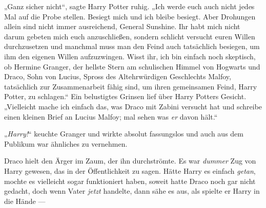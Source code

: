 „Ganz sicher nicht“, sagte Harry Potter ruhig.
„Ich werde euch auch nicht jedes Mal auf die Probe stellen. Besiegt mich und ich bleibe besiegt. Aber Drohungen allein sind nicht immer ausreichend, General Sunshine. Ihr habt mich nicht darum gebeten mich euch anzuschließen, sondern schlicht versucht euren Willen durchzusetzen und manchmal muss man den Feind auch tatsächlich besiegen, um ihm den eigenen Willen aufzuzwingen. Wisst ihr, ich bin einfach noch skeptisch, ob Hermine Granger, der hellste Stern am schulischen Himmel von Hogwarts und Draco, Sohn von Lucius, Spross des Altehrwürdigen Geschlechts Malfoy, tatsächlich zur Zusammenarbeit fähig sind, um ihren gemeinsamen Feind, Harry Potter, zu schlagen.“ Ein belustigtes Grinsen lief über Harry Potters Gesicht.
„Vielleicht mache ich einfach das, was Draco mit Zabini versucht hat und schreibe einen kleinen Brief an Lucius Malfoy; mal sehen was \emph{er} davon hält.“

„\emph{Harry!}“ keuchte Granger und wirkte absolut fassungslos und auch aus dem Publikum war ähnliches zu vernehmen.

Draco hielt den Ärger im Zaum, der ihn durchströmte. Es war \emph{dummer} Zug von Harry gewesen, das in der Öffentlichkeit zu sagen. Hätte Harry es einfach \emph{getan}, mochte es vielleicht sogar funktioniert haben, soweit hatte Draco noch gar nicht gedacht, doch wenn Vater \emph{jetzt} handelte, dann sähe es aus, als spielte er Harry in die Hände —

